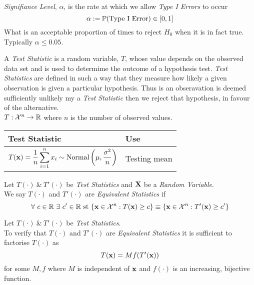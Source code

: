 \documentclass[11pt,a4paper]{article}
\begin{document}
\textit{Signifiance Level}, $\alpha$, is the rate at which we allow \textit{Type I Errors} to occur
$$\alpha:=\mathbb{P}(\text{Type I Error})\in[0,1]$$
\ie What is an acceptable proportion of times to reject $H_0$ when it is in fact true.\\
\nb Typically $\alpha\leq0.05$.\\


A \textit{Test Statistic} is a random variable, $T$, whose value depends on the observed data set and is used to determime the outcome of a hypothesis test. \textit{Test Statistics} are defined in such a way that they measure how likely a given observation is given a particular hypothesis. Thus is an obseravation is deemed sufficiently unlikely my a \textit{Test Statistic} then we reject that hypothesis, in favour of the alternative.\\
\nb $T:\mathcal{X}^n\to\mathbb{R}$ where $n$ is the number of observed values.\\

\begin{center}
\begin{tabular}{|l|l|}
\hline
\textbf{Test Statistic}&\textbf{Use}\\
\hline
${\displaystyle T(\textbf{x})=\frac{1}{n}\sum_{i=1}^nx_i\sim\text{Normal}\left(\mu,\frac{\sigma^2}{n}\right)}$&Testing mean\\
\hline
\end{tabular}
\end{center}

Let $T(\cdot)\ \&\ T'(\cdot)$ be \textit{Test Statistics} and $\textbf{X}$ be a \textit{Random Variable}.\\
We say $T(\cdot)$ and $T'(\cdot)$ are \textit{Equivalent Statistics} if
$$\forall\ c\in\mathbb{R}\ \exists\ c'\in\mathbb{R}\text{ st }\{\textbf{x}\in\mathcal{X}^n:T(\textbf{x})\geq c\}\equiv\{\textbf{x}\in\mathcal{X}^n:T'(\textbf{x})\geq c'\}$$

Let $T(\cdot)\ \&\ T'(\cdot)$ be \textit{Test Statistics}.\\
To verify that $T(\cdot)$ and $T'(\cdot)$ are \textit{Equivalent Statistics} it is sufficient to factorise $T(\cdot)$ as
$$T(\textbf{x})=Mf(T'(\textbf{x}))$$
for some $M,f$ where $M$ is independent of $\textbf{x}$ and $f(\cdot)$ is an increasing, bijective function.\\
\end{document}
